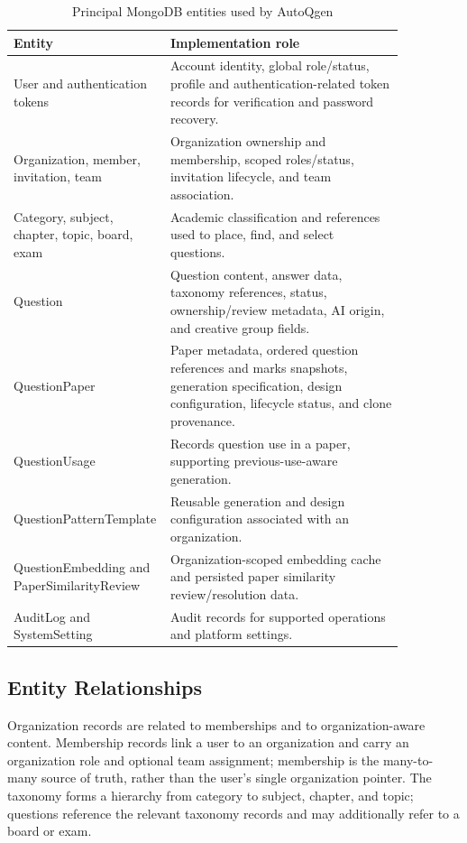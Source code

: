 \begin{table}[H]
    \centering
    \caption{Principal MongoDB entities used by AutoQgen}
    \label{tab:ch4-entities}
    \begin{tabular}{|p{0.27\linewidth}|p{0.59\linewidth}|}
        \hline
        \textbf{Entity} & \textbf{Implementation role} \\
        \hline
        User and authentication tokens & Account identity, global role/status, profile and authentication-related token records for verification and password recovery. \\
        \hline
        Organization, member, invitation, team & Organization ownership and membership, scoped roles/status, invitation lifecycle, and team association. \\
        \hline
        Category, subject, chapter, topic, board, exam & Academic classification and references used to place, find, and select questions. \\
        \hline
        Question & Question content, answer data, taxonomy references, status, ownership/review metadata, AI origin, and creative group fields. \\
        \hline
        QuestionPaper & Paper metadata, ordered question references and marks snapshots, generation specification, design configuration, lifecycle status, and clone provenance. \\
        \hline
        QuestionUsage & Records question use in a paper, supporting previous-use-aware generation. \\
        \hline
        QuestionPatternTemplate & Reusable generation and design configuration associated with an organization. \\
        \hline
        QuestionEmbedding and PaperSimilarityReview & Organization-scoped embedding cache and persisted paper similarity review/resolution data. \\
        \hline
        AuditLog and SystemSetting & Audit records for supported operations and platform settings. \\
        \hline
    \end{tabular}
\end{table}

\subsection{Entity Relationships}

Organization records are related to memberships and to organization-aware content. Membership records link a user to an organization and carry an organization role and optional team assignment; membership is the many-to-many source of truth, rather than the user's single organization pointer. The taxonomy forms a hierarchy from category to subject, chapter, and topic; questions reference the relevant taxonomy records and may additionally refer to a board or exam.


